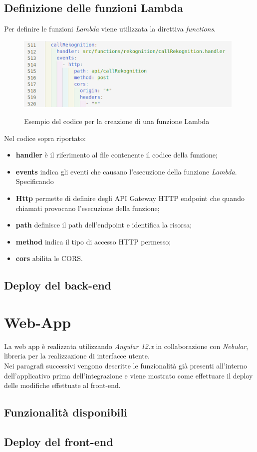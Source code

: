 	\subsection{Definizione delle funzioni Lambda}
	Per definire le funzioni \emph{Lambda} viene utilizzata la direttiva \emph{functions}. 
	
	\begin{figure}[H]
		\centering
		\includegraphics[width=11cm]{immagini/lambda.png} \\
		\caption{\label{fig:lambda} Esempio del codice per la creazione di una funzione Lambda}
	\end{figure}

	Nel codice sopra riportato:
	\begin{itemize}
		\item \textbf{handler} è il riferimento al file contenente il codice della funzione; 
		\item \textbf{events} indica gli eventi che causano l'esecuzione della funzione \emph{Lambda}. Specificando \item \textbf{Http} permette di definire degli API Gateway HTTP endpoint che quando chiamati provocano l'esecuzione della funzione;
		\item \textbf{path} definisce il path dell'endpoint e identifica la risorsa;
		\item \textbf{method} indica il tipo di accesso HTTP permesso;
		\item \textbf{cors} abilita le \gls{CORS}.
	\end{itemize}
	
	\subsection{Deploy del back-end}

\section{Web-App}
La web app è realizzata utilizzando \emph{Angular 12.x} in collaborazione con \emph{Nebular}, libreria per la realizzazione di interfacce utente. \\
Nei paragrafi successivi vengono descritte le funzionalità già presenti all'interno dell'applicativo prima dell'integrazione e viene mostrato come effettuare il \gls{deploy} delle modifiche effettuate al front-end.
	\subsection{Funzionalità disponibili}
	\subsection{Deploy del front-end}